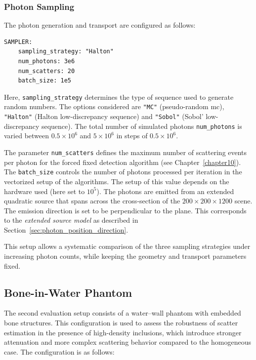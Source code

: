 \subsubsection*{Photon Sampling}
The photon generation and transport are configured as follows:

\begin{lstlisting}
SAMPLER:
    sampling_strategy: "Halton"
    num_photons: 3e6
    num_scatters: 20
    batch_size: 1e5
\end{lstlisting}

Here, \texttt{sampling\_strategy} determines the type of sequence used to
generate random numbers. The options considered are \texttt{"MC"} (pseudo-random
\acf{mc}), \texttt{"Halton"} (Halton low-discrepancy sequence) and
\texttt{"Sobol"} (Sobol' low-discrepancy sequence). The total number of
simulated photons \texttt{num\_photons} is varied between $0.5 \times 10^6$ and
$5 \times 10^6$ in steps of $0.5 \times 10^6$.

The parameter \texttt{num\_scatters} defines the maximum number of scattering
events per photon for the forced fixed detection algorithm (see
Chapter~\ref{chapter10}). The \texttt{batch\_size} controls the number of
photons processed per iteration in the vectorized setup of the algorithms. The
setup of this value depends on the hardware used (here set to $10^5$). The
photons are emitted from an extended quadratic source that spans across the
cross-section of the $200\times 200\times 1200$ scene. The emission direction is
set to be perpendicular to the plane. This corresponds to the \emph{extended
source model} as described in Section~\ref{sec:photon_position_direction}.

This setup allows a systematic comparison of the three
sampling strategies under increasing photon counts, while keeping the geometry
and transport parameters fixed.


\subsection{Bone-in-Water Phantom}
\label{sec:bone_in_water_phantom}

The second evaluation setup consists of a water--wall phantom with embedded bone
structures. This configuration is used to assess the robustness of scatter
estimation in the presence of high-density inclusions, which introduce stronger
attenuation and more complex scattering behavior compared to the homogeneous
case. The configuration is as follows:

